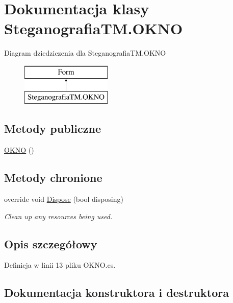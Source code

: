 \hypertarget{class_steganografia_t_m_1_1_o_k_n_o}{}\section{Dokumentacja klasy Steganografia\+T\+M.\+O\+K\+NO}
\label{class_steganografia_t_m_1_1_o_k_n_o}
Diagram dziedziczenia dla Steganografia\+T\+M.\+O\+K\+NO\begin{figure}[H]
\begin{center}
\leavevmode
\includegraphics[height=2.000000cm]{class_steganografia_t_m_1_1_o_k_n_o}
\end{center}
\end{figure}
\subsection*{Metody publiczne}
\begin{DoxyCompactItemize}
\item 
\hyperlink{class_steganografia_t_m_1_1_o_k_n_o_af2d455dfcaa09555d6e4eee1a7ab4d06}{O\+K\+NO} ()
\end{DoxyCompactItemize}
\subsection*{Metody chronione}
\begin{DoxyCompactItemize}
\item 
override void \hyperlink{class_steganografia_t_m_1_1_o_k_n_o_aab165c92013c9cd58f51cf2ae5be4531}{Dispose} (bool disposing)
\begin{DoxyCompactList}\small\item\em Clean up any resources being used. \end{DoxyCompactList}\end{DoxyCompactItemize}


\subsection{Opis szczegółowy}


Definicja w linii 13 pliku O\+K\+N\+O.\+cs.



\subsection{Dokumentacja konstruktora i destruktora}
\mbox{\label{class_steganografia_t_m_1_1_o_k_n_o_af2d455dfcaa09555d6e4eee1a7ab4d06}} 
